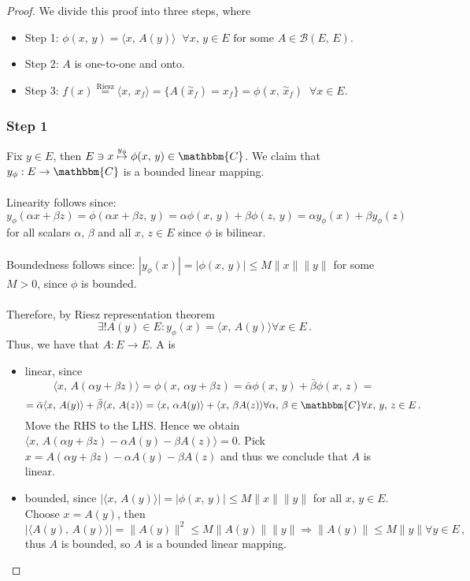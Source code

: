\documentclass[12pt, a4paper]{article}
\newcommand{\C}{\ensuremath{\mathbbm{C}}}
\begin{document}
\begin{proof}
We divide this proof into three steps, where
\begin{itemize}
\item Step 1: $\phi(x,\,y)=\langle x,\,A(y)\rangle\;\;\forall x,\,y\in E\text{ for some }A\in\mathcal{B}(E,\,E)$.
\item Step 2: $A$ is one-to-one and onto.
\item Step 3: $f(x)\overset{\text{Riesz}}{=}\langle x,\,x_f\rangle=\{A(\overset{\sim}{x}_f)=x_f\}=\phi(x,\,\overset{\sim}{x}_f)\;\;\forall x\in E$.
\end{itemize}
\subsubsection*{Step 1}
Fix $y\in E$, then $E\ni x\overset{y_\phi}{\mapsto}\phi(x,\,y)\in\C$. We claim that $y_\phi:E\to\C$ is a bounded linear mapping.
\\\\
Linearity follows since: $y_\phi(\alpha x+\beta z)=\phi(\alpha x+\beta z,\,y)=\alpha\phi(x,\,y)+\beta\phi(z,\,y)=\alpha y_\phi(x)+\beta y_\phi(z)$ for all scalars $\alpha,\,\beta$ and all $x,\,z\in E$ since $\phi$ is bilinear.
\\\\
Boundedness follows since: $|y_\phi(x)|=|\phi(x,\,y)|\leq M\|x\|\|y\|$ for some $M>0$, since $\phi$ is bounded.
\\\\
Therefore, by Riesz representation theorem
\[
    \exists !A(y)\in E:y_\phi(x)=\langle x,\,A(y)\rangle \forall x\in E\,.
\]
Thus, we have that $A:E\to E$. \newline \noindent A is
\begin{itemize}
\item linear, since 
\[
    \langle x,\,A(\alpha y+\beta z)\rangle = \phi(x,\,\alpha y+\beta z)=\bar{\alpha}\phi(x,\,y)+\bar{\beta}\phi(x,\,z)=
\]
\[
    =\bar{\alpha}\langle x,\, A(y)\rangle +\bar{\beta}\langle x,\,A(z)\rangle=\langle x,\,\alpha A(y)\rangle+\langle x,\,\beta A(z)\rangle\forall \alpha,\,\beta\in\C\forall x,\,y,\,z\in E\,.
\]
Move the RHS to the LHS. Hence we obtain $\langle x,\, A(\alpha y+\beta z)-\alpha A(y)-\beta A(z)\rangle=0$. Pick $x= A(\alpha y+\beta z)-\alpha A(y)-\beta A(z)$ and thus we conclude that $A$ is linear.
\item bounded, since $|\langle x,\, A(y)\rangle|=|\phi(x,\,y)|\leq M\|x\|\|y\|$ for all $x,\,y\in E$. Choose $x=A(y)$, then
\[
    |\langle A(y),\,A(y)\rangle|=\|A(y)\|^2\leq M\|A(y)\|\|y\|\Rightarrow \|A(y)\|\leq M\|y\|\forall y\in E\,,
\]
thus $A$ is bounded, so $A$ is a bounded linear mapping.
\end{itemize}

\end{proof}
\end{document}
